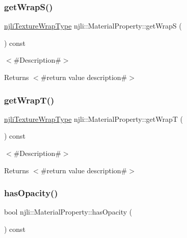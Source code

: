 \subsubsection{\texorpdfstring{get\+Wrap\+S()}{getWrapS()}}
{\footnotesize\ttfamily \mbox{\hyperlink{namespacenjli_a6e9496d4850ec7151f04a220e1979b62}{njli\+Texture\+Wrap\+Type}} njli\+::\+Material\+Property\+::get\+WrapS (\begin{DoxyParamCaption}{ }\end{DoxyParamCaption}) const}

$<$\#\+Description\#$>$

\begin{DoxyReturn}{Returns}
$<$\#return value description\#$>$ 
\end{DoxyReturn}
\mbox{\label{classnjli_1_1_material_property_ad83676a4a57a35e1e8f4ece4942ab300}} 
\subsubsection{\texorpdfstring{get\+Wrap\+T()}{getWrapT()}}
{\footnotesize\ttfamily \mbox{\hyperlink{namespacenjli_a6e9496d4850ec7151f04a220e1979b62}{njli\+Texture\+Wrap\+Type}} njli\+::\+Material\+Property\+::get\+WrapT (\begin{DoxyParamCaption}{ }\end{DoxyParamCaption}) const}

$<$\#\+Description\#$>$

\begin{DoxyReturn}{Returns}
$<$\#return value description\#$>$ 
\end{DoxyReturn}
\mbox{\label{classnjli_1_1_material_property_a81e7c9ce6255bf9a4a07215892b1b5fa}} 
\subsubsection{\texorpdfstring{has\+Opacity()}{hasOpacity()}}
{\footnotesize\ttfamily bool njli\+::\+Material\+Property\+::has\+Opacity (\begin{DoxyParamCaption}{ }\end{DoxyParamCaption}) const}

